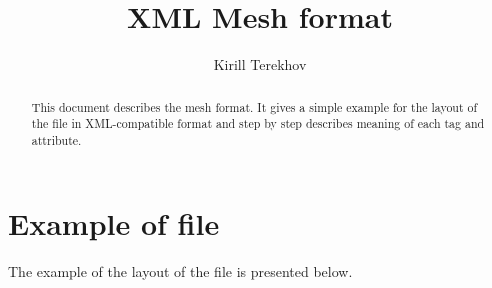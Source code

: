 \documentclass[14pt]{article}
\begin{document}
\title{XML Mesh format}
\author{Kirill Terekhov}

\maketitle

\begin{abstract}
This document describes the mesh format.
It gives a simple example for the layout of the file in 
XML-compatible format and step by step describes
meaning of each tag and attribute.
\end{abstract}

\section{Example of file}

The example of the layout of the file is presented below.
\end{document}
